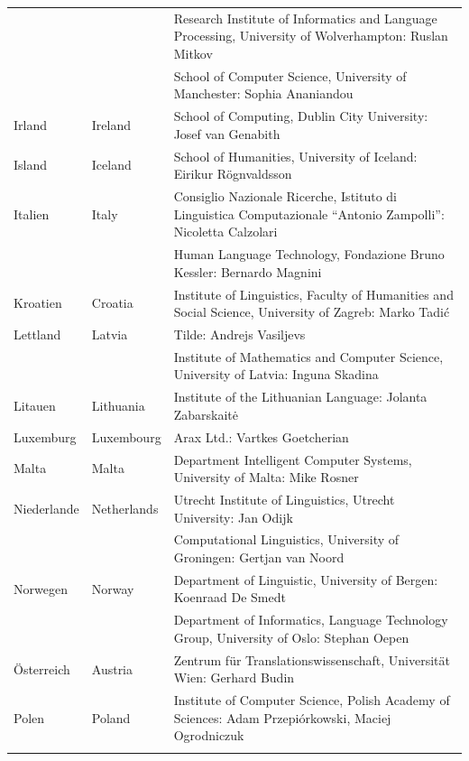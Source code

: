 \documentclass[]{../../metanetpaper}
\begin{document}
\begin{Parallel}[c]{79mm}{78mm}
\begin{longtable}{@{}llp{105mm}@{}}
& & Research Institute of Informatics and Language Processing, University of Wolverhampton: Ruslan Mitkov \\ \addlinespace 
& & School of Computer Science, University of Manchester: Sophia Ananiandou \\ \addlinespace 
Irland & Ireland & School of Computing, Dublin City University: Josef van Genabith\\ \addlinespace
Island & Iceland & School of Humanities, University of Iceland: Eirikur Rögnvaldsson\\ \addlinespace
Italien & Italy & Consiglio Nazionale Ricerche, Istituto di Linguistica Computazionale “Antonio Zampolli”: Nicoletta Calzolari\\ \addlinespace
& & Human Language Technology, Fondazione Bruno Kessler: Bernardo Magnini\\ \addlinespace 
Kroatien & Croatia & Institute of Linguistics, Faculty of Humanities and Social Science, University of Zagreb: Marko Tadić \\ \addlinespace
Lettland & Latvia & Tilde: Andrejs Vasiljevs\\ \addlinespace 
& & Institute of Mathematics and Computer Science, University of Latvia: Inguna Skadina\\ \addlinespace
Litauen & Lithuania & Institute of the Lithuanian Language: Jolanta Zabarskaitė\\ \addlinespace
Luxemburg & Luxembourg & Arax Ltd.: Vartkes Goetcherian\\ \addlinespace
Malta & Malta & Department Intelligent Computer Systems, University of Malta: Mike Rosner\\ \addlinespace
Niederlande & Netherlands & Utrecht Institute of Linguistics, Utrecht University: Jan Odijk\\ \addlinespace 
& & Computational Linguistics, University of Groningen: Gertjan van Noord\\ \addlinespace
Norwegen & Norway & Department of Linguistic, University of Bergen: Koenraad De Smedt\\ \addlinespace 
& & Department of Informatics, Language Technology Group, University of Oslo: Stephan Oepen \\ \addlinespace
Österreich & Austria & Zentrum für Translationswissenschaft, Universität Wien: Gerhard Budin\\ \addlinespace 
Polen & Poland & Institute of Computer Science, Polish Academy of Sciences: Adam Przepiórkowski, Maciej Ogrodniczuk \\ \addlinespace

\end{longtable}
\end{Parallel}
\end{document}
